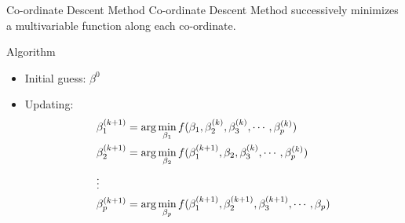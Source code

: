 \documentclass[tikz]{beamer}					%
\begin{document}
{
\begin{frame}{Co-ordinate Descent Method}
Co-ordinate Descent Method successively minimizes a multivariable 
function along each co-ordinate.
\begin{block}{Algorithm}
    \begin{itemize}
        \item Initial guess: $\beta^0$
        \item Updating: 
        \begin{align}
            \beta_1^{(k+1)} &= \arg\min_{\beta_1}
            f(\beta_1,\beta_2^{(k)},\beta_3^{(k)},\cdots,\beta_p^{(k)})\\
            \beta_2^{(k+1)} &= \arg\min_{\beta_2}
            f(\beta_1^{(k+1)},\beta_2,\beta_3^{(k)},\cdots,\beta_p^{(k)})\\
            \intertext{\vdots}
            \beta_p^{(k+1)} &= \arg\min_{\beta_p}
            f(\beta_1^{(k+1)},\beta_2^{(k+1)},\beta_3^{(k+1)},\cdots,\beta_p)
        \end{align}
    \end{itemize}
\end{block}
\end{frame}
}
\end{document}
